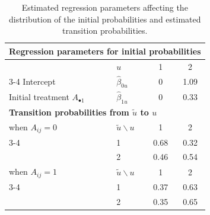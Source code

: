 \begin{table}[ht]
\centering
\caption{Estimated regression parameters affecting the distribution of the initial probabilities and estimated transition probabilities.}
\begin{tabular}{llcc}
\toprule
\multicolumn{4}{l}{\textbf{Regression parameters for initial probabilities}} \\
\midrule
 & $u$ & 1 & 2 \\
\cmidrule{3-4}
Intercept & $\hat{\beta}_{0u}$ & 0 & 1.09 \\
Initial treatment $A_{\bullet 1}$ & $\hat{\beta}_{1u}$ & 0 & 0.33 \\
\midrule
\multicolumn{4}{l}{\textbf{Transition probabilities from $\tilde{u}$ to $u$}} \\
\midrule
when $A_{ij} = 0$ & $\tilde{u} \backslash u$ & 1 & 2 \\
\cmidrule{3-4}
 & 1 & 0.68 & 0.32 \\
 & 2 & 0.46 & 0.54 \\
\midrule
when $A_{ij} = 1$ & $\tilde{u} \backslash u$ & 1 & 2 \\
\cmidrule{3-4}
 & 1 & 0.37 & 0.63 \\
 & 2 & 0.35 & 0.65 \\
\bottomrule
\end{tabular}
\end{table}
